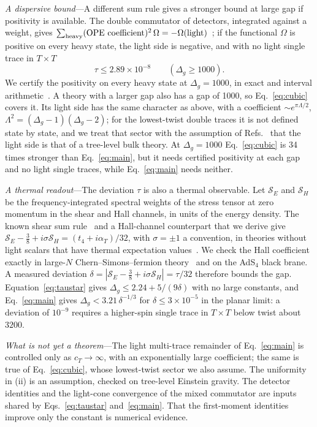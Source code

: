 \documentclass[aps,prl,twocolumn,superscriptaddress,nofootinbib,floatfix]{revtex4-2}
\begin{document}
\textit{A dispersive bound}---A different sum rule gives a stronger bound at large gap if positivity is available. The double commutator of
detectors, integrated against a weight, gives $\sum_{\rm heavy}(\text{OPE coefficient})^2\,\Omega=-\Omega(\text{light})$~\cite{KKSDZ,CLSD,CHMRS};
if the functional $\Omega$ is positive on every heavy state, the light side is negative, and with no light single trace in $T\times T$
\begin{equation}
\tau\le2.89\times10^{-8}\qquad(\Delta_g\ge1000).
\label{eq:cubic}
\end{equation}
We certify the positivity on every heavy state at $\Delta_g=1000$, in exact and interval arithmetic~\cite{SM}. A theory with a larger gap also
has a gap of 1000, so Eq.~\eqref{eq:cubic} covers it. Its light side has the same character as above, with a coefficient
$\sim e^{\pi\Lambda/2}$, $\Lambda^2=(\Delta_g-1)(\Delta_g-2)$; for the lowest-twist double traces it is not defined state by state, and we
treat that sector with the assumption of Refs.~\cite{CHMRS,CLSD} that the light side is that of a tree-level bulk theory. At
$\Delta_g=1000$ Eq.~\eqref{eq:cubic} is 34 times stronger than Eq.~\eqref{eq:main}, but it needs certified positivity at each gap and no light
single traces, while Eq.~\eqref{eq:main} needs neither.

\textit{A thermal readout}---The deviation $\tau$ is also a thermal observable. Let $\mathcal S_E$ and $\mathcal S_H$ be the frequency-integrated
spectral weights of the stress tensor at zero momentum in the shear and Hall channels, in units of the energy density. The known shear
sum rule~\cite{Chowdhury:2016hjy} and a Hall-channel counterpart that we derive give $\mathcal S_E-\tfrac38+i\sigma\mathcal S_H=(t_4+i\alpha_T)/32$,
with $\sigma=\pm1$ a convention, in theories without light scalars that have thermal expectation values~\cite{SM,Lucas:2017dqa}. We check the
Hall coefficient exactly in large-$N$ Chern--Simons--fermion theory~\cite{Ghosh:2019sqf} and on the AdS$_4$ black brane. A measured deviation
$\delta=|\mathcal S_E-\tfrac38+i\sigma\mathcal S_H|=\tau/32$ therefore bounds the gap. Equation~\eqref{eq:taustar} gives
$\Delta_g\le2.24+5/(9\delta)$ with no large constants, and Eq.~\eqref{eq:main} gives $\Delta_g<3.21\,\delta^{-1/3}$ for $\delta\le3\times10^{-5}$
in the planar limit: a deviation of $10^{-9}$ requires a higher-spin single trace in $T\times T$ below twist about $3200$.

\textit{What is not yet a theorem}---The light multi-trace remainder of Eq.~\eqref{eq:main} is controlled only as $c_T\to\infty$, with an
exponentially large coefficient; the same is true of Eq.~\eqref{eq:cubic}, whose lowest-twist sector we also assume. The uniformity in (ii) is
an assumption, checked on tree-level Einstein gravity. The detector identities and the light-cone convergence of the mixed commutator are
inputs shared by Eqs.~\eqref{eq:taustar} and~\eqref{eq:main}. That the first-moment identities improve only the constant is numerical evidence.
\end{document}
